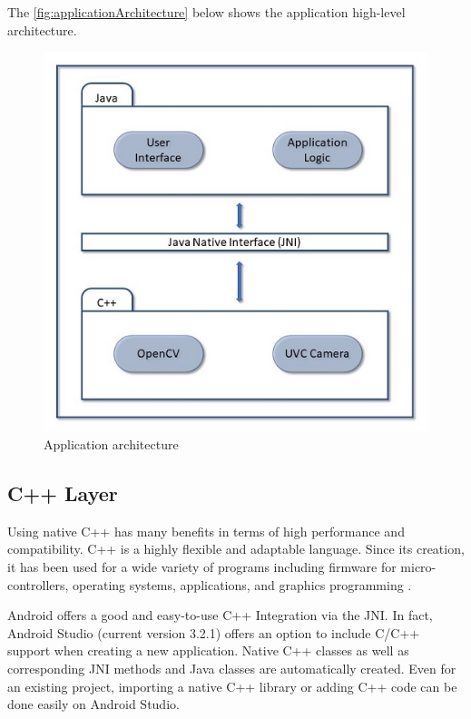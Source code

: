The \autoref{fig:applicationArchitecture} below shows the application high-level architecture.


\begin{figure}[H]
\centering
\includegraphics{figures/applicationArchitecture.JPG}

\caption[Application architecture]{Application architecture}\label{fig:applicationArchitecture}
\end{figure}
\subsection{C++ Layer}

Using native C++ has many benefits in terms of high performance and compatibility.
C++ is a highly flexible and adaptable language. Since its creation, it has been used for a wide variety of programs including firmware for micro-controllers, operating systems, applications, and graphics programming \parencite{cpp}.

Android offers a good and easy-to-use C++ Integration via the JNI. In fact, Android Studio (current version 3.2.1) offers an option to include C/C++ support when creating a new application. Native C++ classes as well as corresponding JNI methods and Java classes are automatically created. Even for an existing project, importing a native C++ library or adding C++ code can be done easily on Android Studio.

